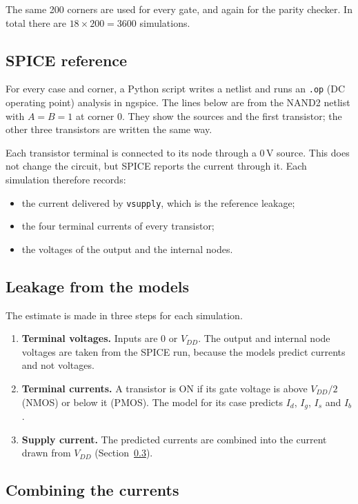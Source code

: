 \documentclass{article}
\begin{document}
The same 200 corners are used for every gate, and again for the parity
checker. In total there are $18 \times 200 = 3600$ simulations.

\subsection{SPICE reference}

For every case and corner, a Python script writes a netlist and runs an
\texttt{.op} (DC operating point) analysis in ngspice. The lines below are
from the NAND2 netlist with $A = B = 1$ at corner 0. They show the sources
and the first transistor; the other three transistors are written the same
way.

Each transistor terminal is connected to its node through a 0\,V source.
This does not change the circuit, but SPICE reports the current through it.
Each simulation therefore records:
\begin{itemize}
    \item the current delivered by \texttt{vsupply}, which is the reference
          leakage;
    \item the four terminal currents of every transistor;
    \item the voltages of the output and the internal nodes.
\end{itemize}

\subsection{Leakage from the models}

The estimate is made in three steps for each simulation.
\begin{enumerate}
    \item \textbf{Terminal voltages.} Inputs are 0 or $V_{DD}$. The output
          and internal node voltages are taken from the SPICE run, because
          the models predict currents and not voltages.
    \item \textbf{Terminal currents.} A transistor is ON if its gate voltage
          is above $V_{DD}/2$ (NMOS) or below it (PMOS). The model for its
          case predicts $I_d$, $I_g$, $I_s$ and $I_b$.
    \item \textbf{Supply current.} The predicted currents are combined into
          the current drawn from $V_{DD}$ (Section~\ref{sec:combine}).
\end{enumerate}

\subsection{Combining the currents}
\label{sec:combine}
\end{document}
